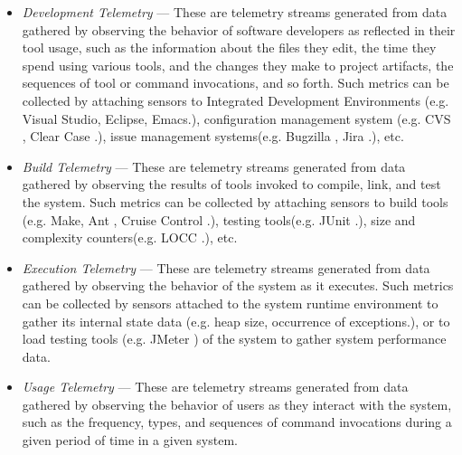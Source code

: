 \begin{itemize}
	\item \textit{Development Telemetry} --- These are telemetry streams generated from data gathered by observing the behavior of software developers as reflected in their tool usage, such as the information about the files they edit, the time they spend using various tools, and the changes they make to project artifacts, the sequences of tool or command invocations, and so forth. Such metrics can be collected by attaching sensors to Integrated Development Environments (e.g. Visual Studio, Eclipse, Emacs.), configuration management system (e.g. CVS \cite{Software:CVS}, Clear Case \cite{Software:ClearCase}.), issue management systems(e.g. Bugzilla \cite{Software:Bugzilla}, Jira \cite{Software:Jira}.), etc.
	
	\item \textit{Build Telemetry} --- These are telemetry streams generated from data gathered by observing the results of tools invoked to compile, link, and test the system. Such metrics can be collected by attaching sensors to build tools (e.g. Make, Ant \cite{Software:Ant}, Cruise Control \cite{Software:CruiseControl}.), testing tools(e.g. JUnit \cite{Software:JUnit}.), size and complexity counters(e.g. LOCC \cite{Software:LOCC}.), etc.
	
	\item \textit{Execution Telemetry} --- These are telemetry streams generated from data gathered by observing the behavior of the system as it executes. Such metrics can be collected by sensors attached to the system runtime environment to gather its internal state data (e.g. heap size, occurrence of exceptions.), or to load testing tools (e.g. JMeter \cite{Software:JMeter}) of the system to gather system performance data.
	
	\item \textit{Usage Telemetry} --- These are telemetry streams generated from data gathered by observing the behavior of users as they interact with the system, such as the frequency, types, and sequences of command invocations during a given period of time in a given system.

\end{itemize}










